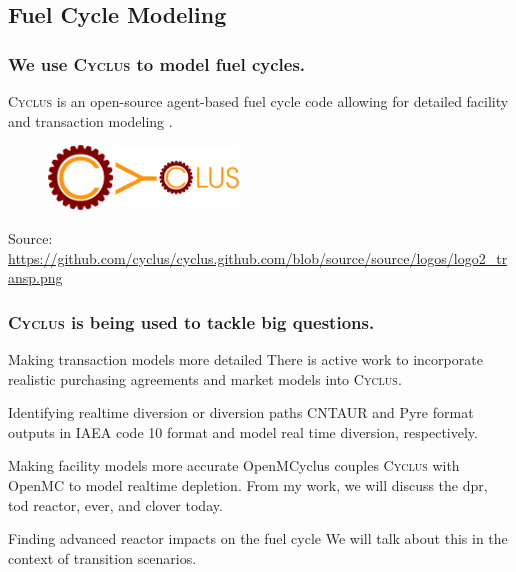 \documentclass[9pt]{beamer}
\newcommand{\cyclus}{\textsc{Cyclus}\xspace}
\begin{document}
\subsection{Fuel Cycle Modeling}
  \begin{frame}
    \frametitle{We use \cyclus to model fuel cycles.}
    \vspace{20pt}
    \cyclus is an open-source agent-based fuel cycle code allowing for detailed facility and transaction modeling \cite{huff_fundamental_2016}.
    \vspace{20pt}
    \begin{figure}
        \centering
        \includegraphics[width=0.45\textwidth]{images/cyclus_logo.png}
    \end{figure}

    \vspace{37pt}
    Source: \url{https://github.com/cyclus/cyclus.github.com/blob/source/source/logos/logo2_transp.png}
  \end{frame}

  \begin{frame}
    \frametitle{\cyclus is being used to tackle big questions.}
    \begin{block}{Making transaction models more detailed}
        There is active work to incorporate realistic purchasing agreements and market models into \cyclus.
    \end{block}
    \begin{block}{Identifying realtime diversion or diversion paths}
        CNTAUR \cite{mummah_advanced_2024} and Pyre \cite{westphal_modeling_2019} format outputs in IAEA code 10 format and model real time diversion, respectively.
    \end{block}
    \begin{block}{Making facility models more accurate}
      OpenMCyclus \cite{openmcyclus_paper} couples \cyclus with OpenMC to model realtime depletion. From my work, we will discuss the \gls{dpr}, \gls{tod} reactor, \gls{ever}, and \gls{clover} today.
  \end{block}
    \begin{block}{Finding advanced reactor impacts on the fuel cycle}
        We will talk about this in the context of transition scenarios.
    \end{block}
  \end{frame}
\end{document}
